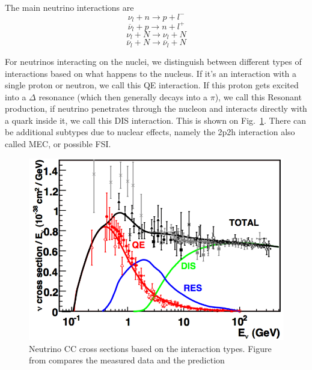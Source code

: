 The main neutrino interactions are
\begin{equation}
\nu_l+n\rightarrow p+l^-
\end{equation}
\begin{equation}
\overline{\nu}_l+p\rightarrow n+l^+
\end{equation}
\begin{equation}
\nu_l+N\rightarrow\nu_l+N
\end{equation}
\begin{equation}
\overline{\nu}_l+N\rightarrow\overline{\nu}_l+N
\end{equation}

For neutrinos interacting on the nuclei, we distinguish between different types of interactions based on what happens to the nucleus. If it's an interaction with a single proton or neutron, we call this \gls{QE} interaction. If this proton gets excited into a $\Delta$ resonance (which then generally decays into a $\pi$), we call this Resonant production, if neutrino penetrates through the nucleon and interacts directly with a quark inside it, we call this \gls{DIS} interaction. This is shown on Fig.~\ref{fig:NuCCCrossSection}. There can be additional subtypes due to nuclear effects, namely the 2p2h interaction  also called \gls{MEC}, or possible \gls{FSI}.

\begin{figure}[hbtp]
\centering
\includegraphics[width=0.8\linewidth]{Plots/Theory/NeutrinoCCCrossSections.png}
\caption[Neutrino CC cross sections based on the interaction types]{Neutrino \acrshort{CC} cross sections based on the interaction types. Figure from \cite{NeutrinoCCCrossSectionPlot.pdf} compares the measured data \cite{NeutrinoIntOverview2012.pdf} and the prediction \cite{NuanceNuIntSimulation2002.pdf}}
\label{fig:NuCCCrossSection}
\end{figure}



